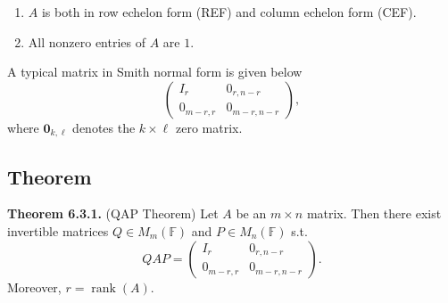 \documentclass[12pt]{article}
\begin{document}
\begin{enumerate}
    \item $A$ is both in row echelon form (REF) and column echelon form (CEF).
    \item All nonzero entries of $A$ are $1$.
\end{enumerate}

A typical matrix in Smith normal form is given below
\[
\begin{pmatrix}
I_r & 0_{r,n-r}\\
0_{m-r,r} & 0_{m-r,n-r}
\end{pmatrix},
\]
where $\mathbf{0}_{k,\ell}$ denotes the $k\times\ell$ zero matrix.

\subsection{Theorem}

\textbf{Theorem 6.3.1.} (QAP Theorem)
Let $A$ be an $m\times n$ matrix. Then there exist invertible matrices
$Q\in M_m(\mathbb{F})$ and $P\in M_n(\mathbb{F})$
s.t.
\[
QAP=
\begin{pmatrix}
I_r & 0_{r,n-r}\\
0_{m-r,r} & 0_{m-r,n-r}
\end{pmatrix}.
\]
Moreover, $r=\operatorname{rank}(A)$.
\end{document}
